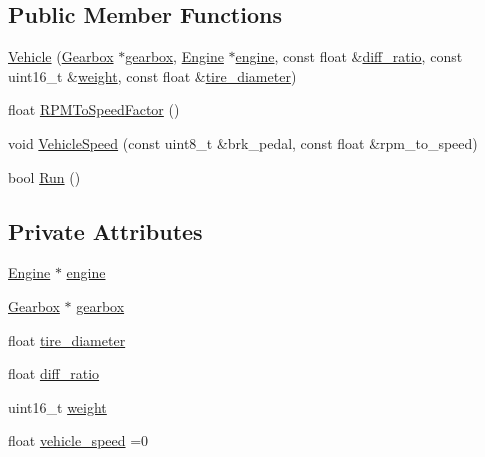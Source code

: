 \subsection*{Public Member Functions}
\begin{DoxyCompactItemize}
\item 
\hyperlink{classVehicle_a545cb4416e5aa5c15311964a3de033fb}{Vehicle} (\hyperlink{classGearbox}{Gearbox} $\ast$\hyperlink{classVehicle_a5767df448358b995871f1caac195ea85}{gearbox}, \hyperlink{classEngine}{Engine} $\ast$\hyperlink{classVehicle_a84d681d0a67c864c023a84437d00ed21}{engine}, const float \&\hyperlink{classVehicle_ac24546ecc3efb25ea01e8d0e322c2785}{diff\+\_\+ratio}, const uint16\+\_\+t \&\hyperlink{classVehicle_aa7261c96ee3a5a4c039bf33432178fd9}{weight}, const float \&\hyperlink{classVehicle_ab36dab20fe34b27846ea5621693987f8}{tire\+\_\+diameter})
\item 
float \hyperlink{classVehicle_a52a12c60b5a8885dc9f95643c84958a8}{R\+P\+M\+To\+Speed\+Factor} ()
\item 
void \hyperlink{classVehicle_a0967229be7b0b40b3f84c86942e43a52}{Vehicle\+Speed} (const uint8\+\_\+t \&brk\+\_\+pedal, const float \&rpm\+\_\+to\+\_\+speed)
\item 
bool \hyperlink{classVehicle_a407e09d1ff69f43d3c4aa77f4f32a51c}{Run} ()
\end{DoxyCompactItemize}
\subsection*{Private Attributes}
\begin{DoxyCompactItemize}
\item 
\hyperlink{classEngine}{Engine} $\ast$ \hyperlink{classVehicle_a84d681d0a67c864c023a84437d00ed21}{engine}
\item 
\hyperlink{classGearbox}{Gearbox} $\ast$ \hyperlink{classVehicle_a5767df448358b995871f1caac195ea85}{gearbox}
\item 
float \hyperlink{classVehicle_ab36dab20fe34b27846ea5621693987f8}{tire\+\_\+diameter}
\item 
float \hyperlink{classVehicle_ac24546ecc3efb25ea01e8d0e322c2785}{diff\+\_\+ratio}
\item 
uint16\+\_\+t \hyperlink{classVehicle_aa7261c96ee3a5a4c039bf33432178fd9}{weight}
\item 
float \hyperlink{classVehicle_addeee407ebf67da1e69b608f6dda4656}{vehicle\+\_\+speed} =0
\end{DoxyCompactItemize}


